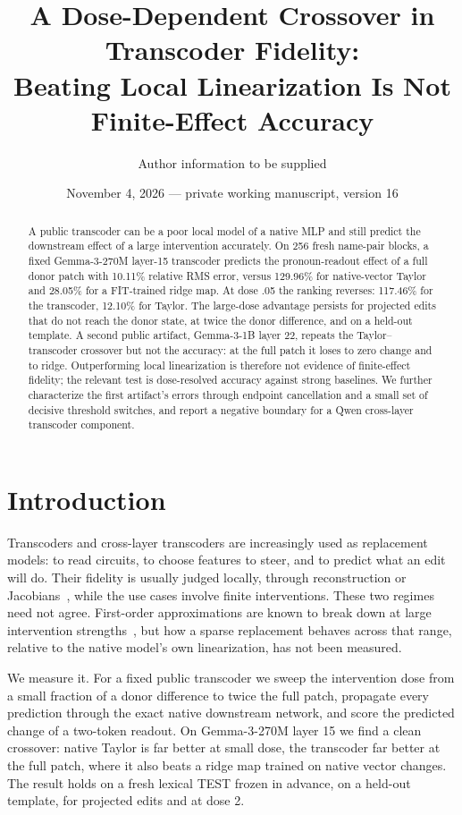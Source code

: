 \documentclass[11pt]{article}
\title{A Dose-Dependent Crossover in Transcoder Fidelity:\\Beating Local Linearization Is Not Finite-Effect Accuracy}
\author{Author information to be supplied}
\date{November 4, 2026 --- private working manuscript, version 16}
\begin{document}
\maketitle
\begin{abstract}
A public transcoder can be a poor local model of a native MLP and still predict the downstream effect of a large intervention accurately. On 256 fresh name-pair blocks, a fixed Gemma-3-270M layer-15 transcoder predicts the pronoun-readout effect of a full donor patch with 10.11\% relative RMS error, versus 129.96\% for native-vector Taylor and 28.05\% for a FIT-trained ridge map. At dose .05 the ranking reverses: 117.46\% for the transcoder, 12.10\% for Taylor. The large-dose advantage persists for projected edits that do not reach the donor state, at twice the donor difference, and on a held-out template. A second public artifact, Gemma-3-1B layer 22, repeats the Taylor--transcoder crossover but not the accuracy: at the full patch it loses to zero change and to ridge. Outperforming local linearization is therefore not evidence of finite-effect fidelity; the relevant test is dose-resolved accuracy against strong baselines. We further characterize the first artifact's errors through endpoint cancellation and a small set of decisive threshold switches, and report a negative boundary for a Qwen cross-layer transcoder component.
\end{abstract}

\section{Introduction}
Transcoders and cross-layer transcoders are increasingly used as replacement models: to read circuits, to choose features to steer, and to predict what an edit will do. Their fidelity is usually judged locally, through reconstruction or Jacobians~\cite{shabalin2026}, while the use cases involve finite interventions. These two regimes need not agree. First-order approximations are known to break down at large intervention strengths~\cite{syed2023,guo2026}, but how a sparse replacement behaves across that range, relative to the native model's own linearization, has not been measured.

We measure it. For a fixed public transcoder we sweep the intervention dose from a small fraction of a donor difference to twice the full patch, propagate every prediction through the exact native downstream network, and score the predicted change of a two-token readout. On Gemma-3-270M layer 15 we find a clean crossover: native Taylor is far better at small dose, the transcoder far better at the full patch, where it also beats a ridge map trained on native vector changes. The result holds on a fresh lexical TEST frozen in advance, on a held-out template, for projected edits and at dose 2.
\end{document}
